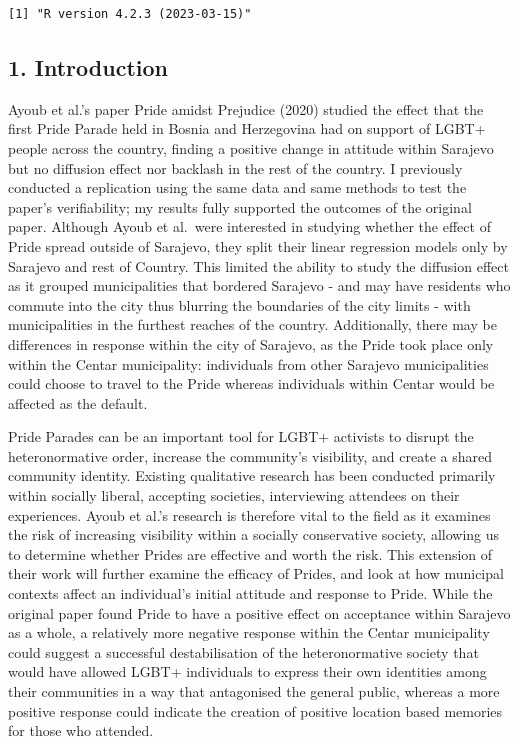 \documentclass[
]{article}
\begin{document}
\begin{verbatim}
[1] "R version 4.2.3 (2023-03-15)"
\end{verbatim}

\hypertarget{introduction}{%
\subsection{1. Introduction}\label{introduction}}

Ayoub et al.'s paper Pride amidst Prejudice (2020) studied the effect
that the first Pride Parade held in Bosnia and Herzegovina had on
support of LGBT+ people across the country, finding a positive change in
attitude within Sarajevo but no diffusion effect nor backlash in the
rest of the country. I previously conducted a replication using the same
data and same methods to test the paper's verifiability; my results
fully supported the outcomes of the original paper. Although Ayoub et
al.~were interested in studying whether the effect of Pride spread
outside of Sarajevo, they split their linear regression models only by
Sarajevo and rest of Country. This limited the ability to study the
diffusion effect as it grouped municipalities that bordered Sarajevo -
and may have residents who commute into the city thus blurring the
boundaries of the city limits - with municipalities in the furthest
reaches of the country. Additionally, there may be differences in
response within the city of Sarajevo, as the Pride took place only
within the Centar municipality: individuals from other Sarajevo
municipalities could choose to travel to the Pride whereas individuals
within Centar would be affected as the default.

Pride Parades can be an important tool for LGBT+ activists to disrupt
the heteronormative order, increase the community's visibility, and
create a shared community identity. Existing qualitative research has
been conducted primarily within socially liberal, accepting societies,
interviewing attendees on their experiences. Ayoub et al.'s research is
therefore vital to the field as it examines the risk of increasing
visibility within a socially conservative society, allowing us to
determine whether Prides are effective and worth the risk. This
extension of their work will further examine the efficacy of Prides, and
look at how municipal contexts affect an individual's initial attitude
and response to Pride. While the original paper found Pride to have a
positive effect on acceptance within Sarajevo as a whole, a relatively
more negative response within the Centar municipality could suggest a
successful destabilisation of the heteronormative society that would
have allowed LGBT+ individuals to express their own identities among
their communities in a way that antagonised the general public, whereas
a more positive response could indicate the creation of positive
location based memories for those who attended.
\end{document}
